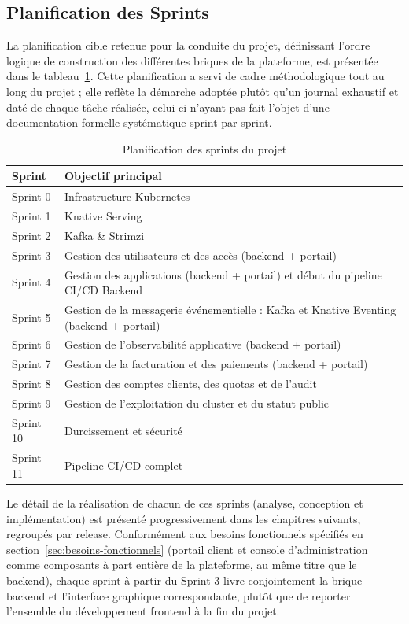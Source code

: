 \subsection{Planification des Sprints}

La planification cible retenue pour la conduite du projet, définissant l'ordre logique de construction des différentes briques de la plateforme, est présentée dans le tableau~\ref{tab:sprints}. Cette planification a servi de cadre méthodologique tout au long du projet ; elle reflète la démarche adoptée plutôt qu'un journal exhaustif et daté de chaque tâche réalisée, celui-ci n'ayant pas fait l'objet d'une documentation formelle systématique sprint par sprint.

\begin{table}[H]
\centering
\renewcommand{\arraystretch}{1.3}
\begin{tabular}{|p{3cm}|p{10cm}|}
\hline
Sprint & Objectif principal \\
\hline
Sprint 0  & Infrastructure Kubernetes \\
\hline
Sprint 1  & Knative Serving \\
\hline
Sprint 2  & Kafka \& Strimzi \\
\hline
Sprint 3  & Gestion des utilisateurs et des accès (backend + portail) \\
\hline
Sprint 4  & Gestion des applications (backend + portail) et début du pipeline CI/CD Backend \\
\hline
Sprint 5  & Gestion de la messagerie événementielle : Kafka et Knative Eventing (backend + portail) \\
\hline
Sprint 6  & Gestion de l'observabilité applicative (backend + portail) \\
\hline
Sprint 7  & Gestion de la facturation et des paiements (backend + portail) \\
\hline
Sprint 8  & Gestion des comptes clients, des quotas et de l'audit \\
\hline
Sprint 9  & Gestion de l'exploitation du cluster et du statut public \\
\hline
Sprint 10 & Durcissement et sécurité \\
\hline
Sprint 11 & Pipeline CI/CD complet \\
\hline
\end{tabular}
\caption{Planification des sprints du projet}
\label{tab:sprints}
\end{table}

Le détail de la réalisation de chacun de ces sprints (analyse, conception et implémentation) est présenté progressivement dans les chapitres suivants, regroupés par release. Conformément aux besoins fonctionnels spécifiés en section~\ref{sec:besoins-fonctionnels} (portail client et console d'administration comme composants à part entière de la plateforme, au même titre que le backend), chaque sprint à partir du Sprint 3 livre conjointement la brique backend et l'interface graphique correspondante, plutôt que de reporter l'ensemble du développement frontend à la fin du projet.

